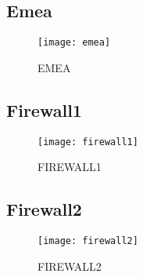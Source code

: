 	\subsection{Emea}
		\begin{figure}[H]
			\centering
			\texttt{[image: emea]}
			\caption{EMEA}
			\label{fig:emea}
		\end{figure}
	\subsection{Firewall1}
		\begin{figure}[H]
			\centering
			\texttt{[image: firewall1]}
			\caption{FIREWALL1}
			\label{fig:firewall1}
		\end{figure}
	\subsection{Firewall2}
		\begin{figure}[H]
			\centering
			\texttt{[image: firewall2]}
			\caption{FIREWALL2}
			\label{fig:firewall2}
		\end{figure}